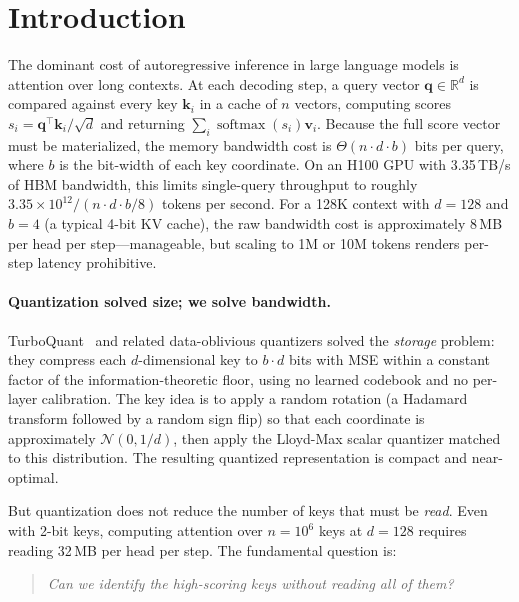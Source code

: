 \documentclass[10pt,twocolumn]{article}
\theoremstyle{definition}
\newcommand{\R}{\mathbb{R}}
\newcommand{\calN}{\mathcal{N}}
\newcommand{\bq}{\mathbf{q}}
\newcommand{\bk}{\mathbf{k}}
\newcommand{\bv}{\mathbf{v}}
\DeclareMathOperator*{\softmax}{softmax}
\begin{document}
\section{Introduction}
\label{sec:intro}

The dominant cost of autoregressive inference in large language models is
attention over long contexts.  At each decoding step, a query vector
$\bq \in \R^d$ is compared against every key $\bk_i$ in a cache of $n$ vectors,
computing scores $s_i = \bq^\top \bk_i / \sqrt{d}$ and returning
$\sum_i \softmax(s_i) \bv_i$.  Because the full score vector must be
materialized, the memory bandwidth cost is $\Theta(n \cdot d \cdot b)$ bits per
query, where $b$ is the bit-width of each key coordinate.  On an H100 GPU with
3.35\,TB/s of HBM bandwidth, this limits single-query throughput to roughly
$3.35 \times 10^{12} / (n \cdot d \cdot b/8)$ tokens per second.  For a 128K
context with $d=128$ and $b=4$ (a typical 4-bit KV cache), the raw bandwidth
cost is approximately $8$\,MB per head per step---manageable, but scaling to 1M
or 10M tokens renders per-step latency prohibitive.

\paragraph{Quantization solved size; we solve bandwidth.}
TurboQuant~\cite{turboquant2025} and related data-oblivious quantizers solved
the \emph{storage} problem: they compress each $d$-dimensional key to $b \cdot d$
bits with MSE within a constant factor of the information-theoretic floor, using
no learned codebook and no per-layer calibration.  The key idea is to apply a
random rotation (a Hadamard transform followed by a random sign flip) so that
each coordinate is approximately $\calN(0, 1/d)$, then apply the Lloyd-Max
scalar quantizer matched to this distribution.  The resulting quantized
representation is compact and near-optimal.

But quantization does not reduce the number of keys that must be \emph{read}.
Even with 2-bit keys, computing attention over $n = 10^6$ keys at $d = 128$
requires reading 32\,MB per head per step.  The fundamental question is:

\begin{quote}
\emph{Can we identify the high-scoring keys without reading all of them?}
\end{quote}
\end{document}
